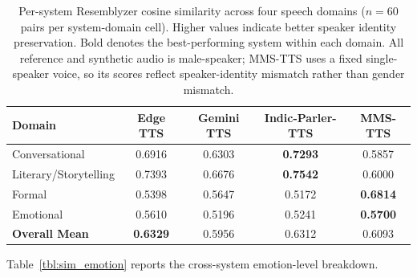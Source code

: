 \documentclass[a4paper,fleqn]{cas-dc}
\begin{document}
    \begin{table}[t]
    \caption{Per-system Resemblyzer cosine similarity across four speech
    domains ($n = 60$ pairs per system-domain cell). Higher values indicate
    better speaker identity preservation. Bold denotes the best-performing
    system within each domain. All reference and synthetic audio is
    male-speaker; MMS-TTS uses a fixed single-speaker voice, so its scores
    reflect speaker-identity mismatch rather than gender
    mismatch.}\label{tbl:sim_system}
    \small
    \renewcommand{\arraystretch}{1.15}
    
    \begin{tabular*}{\textwidth}{@{\extracolsep{\fill}}lcccc@{}}
    \toprule
    \textbf{Domain} & \textbf{Edge TTS} & \textbf{Gemini TTS} &
    \textbf{Indic-Parler-TTS} & \textbf{MMS-TTS} \\
    \midrule
    Conversational        & 0.6916          & 0.6303          & \textbf{0.7293} & 0.5857 \\
    Literary/Storytelling & 0.7393          & 0.6676          & \textbf{0.7542} & 0.6000 \\
    Formal                & 0.5398          & 0.5647          & 0.5172          & \textbf{0.6814} \\
    Emotional             & 0.5610          & 0.5196          & 0.5241          & \textbf{0.5700} \\
    \midrule
    \textbf{Overall Mean} & \textbf{0.6329} & 0.5956          & 0.6312          & 0.6093 \\
    \bottomrule
    \end{tabular*}
    \end{table}
    
    


    Table~\ref{tbl:sim_emotion} reports the cross-system emotion-level breakdown.
    
\end{document}
